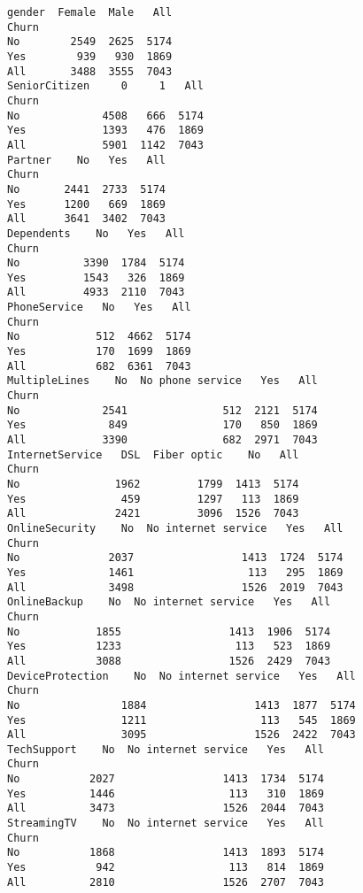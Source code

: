 \documentclass[11pt]{article}
\begin{document}
    \begin{Verbatim}[commandchars=\\\{\}]
gender  Female  Male   All
Churn                     
No        2549  2625  5174
Yes        939   930  1869
All       3488  3555  7043
SeniorCitizen     0     1   All
Churn                          
No             4508   666  5174
Yes            1393   476  1869
All            5901  1142  7043
Partner    No   Yes   All
Churn                    
No       2441  2733  5174
Yes      1200   669  1869
All      3641  3402  7043
Dependents    No   Yes   All
Churn                       
No          3390  1784  5174
Yes         1543   326  1869
All         4933  2110  7043
PhoneService   No   Yes   All
Churn                        
No            512  4662  5174
Yes           170  1699  1869
All           682  6361  7043
MultipleLines    No  No phone service   Yes   All
Churn                                            
No             2541               512  2121  5174
Yes             849               170   850  1869
All            3390               682  2971  7043
InternetService   DSL  Fiber optic    No   All
Churn                                         
No               1962         1799  1413  5174
Yes               459         1297   113  1869
All              2421         3096  1526  7043
OnlineSecurity    No  No internet service   Yes   All
Churn                                                
No              2037                 1413  1724  5174
Yes             1461                  113   295  1869
All             3498                 1526  2019  7043
OnlineBackup    No  No internet service   Yes   All
Churn                                              
No            1855                 1413  1906  5174
Yes           1233                  113   523  1869
All           3088                 1526  2429  7043
DeviceProtection    No  No internet service   Yes   All
Churn                                                  
No                1884                 1413  1877  5174
Yes               1211                  113   545  1869
All               3095                 1526  2422  7043
TechSupport    No  No internet service   Yes   All
Churn                                             
No           2027                 1413  1734  5174
Yes          1446                  113   310  1869
All          3473                 1526  2044  7043
StreamingTV    No  No internet service   Yes   All
Churn                                             
No           1868                 1413  1893  5174
Yes           942                  113   814  1869
All          2810                 1526  2707  7043

\end{Verbatim}
\end{document}
